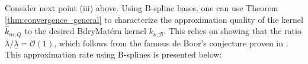\documentclass[aos,preprint]{imsart}
\theoremstyle{plain}
\newcommand{\CalO}{\mathcal O}
\newcommand{\BFx}{\bold x}
\newcommand{\BU}{\bold U}
\newcommand{\BK}{\bold K}
\newcommand{\BPhi}{\boldsymbol{\Phi}}
\theoremstyle{remark}
\begin{document}

Consider next point (iii) above. Using B-spline bases, one can use Theorem \ref{thm:convergence_general} to characterize the approximation quality of the kernel $\hat{k}_{m,Q}$ to the desired BdryMat\'ern kernel $k_{\nu,\mathcal{B}}$. This relies on showing that the ratio $\overline{\lambda}/\underline{\lambda} = \mathcal{O}(1)$, which follows from the famous de Boor's conjecture proven in \cite{shadrin2001norm}. This approximation rate using B-splines is presented below:
\end{document}
